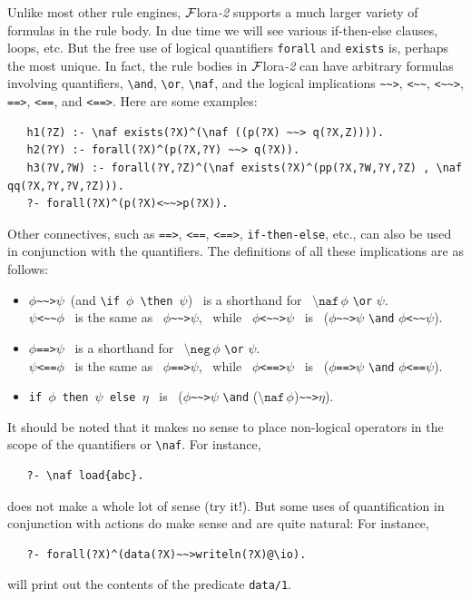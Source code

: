 \documentclass[11pt]{article}
\newcommand{\FLORA}{{\mbox{\sc ${\cal F}${lora}\rm\emph{-2}}}\xspace}
\newcommand{\FLSYSTEM}{\FLORA}
\newcommand{\rnafarr}{\texttt{\textasciitilde\textasciitilde>}}
\newcommand{\lnafarr}{\texttt{<\textasciitilde\textasciitilde}}
\newcommand{\rlnafarr}{\texttt{<\textasciitilde\textasciitilde>}}
\newcommand{\bs}{\textbackslash}
\newcommand{\RULELOGNAF}{{\texttt{{\bs}naf}}\xspace}
\newcommand{\RULELOGNEG}{{\texttt{{\bs}neg}}\xspace}
\begin{document}
\index{\rnafarr}
\index{\lnafarr}
\index{\rlnafarr}
\index{\url{==>}}
\index{\url{<==}}
\index{\url{<==>}}
Unlike most other rule engines, \FLSYSTEM supports a much larger variety of
formulas in the rule body. In due time we will see various if-then-else
clauses, loops, etc. But the free use of logical quantifiers \texttt{forall} and
\texttt{exists} is, perhaps the most unique. In fact, the rule bodies in 
\FLSYSTEM can have
arbitrary formulas involving quantifiers, \texttt{\bs{}and},
\texttt{\bs{}or}, \texttt{\RULELOGNAF}, and the logical implications \rnafarr,
\lnafarr, \rlnafarr, \texttt{==>}, \texttt{<==}, and \texttt{<==>}.
Here are some examples:
\begin{verbatim}
   h1(?Z) :- \naf exists(?X)^(\naf ((p(?X) ~~> q(?X,Z)))).
   h2(?Y) :- forall(?X)^(p(?X,?Y) ~~> q(?X)). 
   h3(?V,?W) :- forall(?Y,?Z)^(\naf exists(?X)^(pp(?X,?W,?Y,?Z) , \naf qq(?X,?Y,?V,?Z))).
   ?- forall(?X)^(p(?X)<~~>p(?X)).
\end{verbatim}
Other connectives, such as \texttt{==>}, \texttt{<==}, \texttt{<==>}, \texttt{if-then-else}, etc., 
can also be used in conjunction with the quantifiers.
The definitions of all these implications are as follows:
\begin{itemize}
\item  $\phi$\rnafarr$\psi$\, (and
  \texttt{\bs{}if\,$\phi$\,\bs{}then\,$\psi$})~
  is a shorthand for~ $\RULELOGNAF\,\phi$
  \texttt{\bs{}or} $\psi$.\\
  $\psi$\lnafarr$\phi$~ is the same as~ $\phi$\rnafarr$\psi$,~ while~
  $\phi$\rlnafarr$\psi$~ is~ ($\phi$\rnafarr$\psi$ \texttt{\bs{}and} 
  $\phi$\lnafarr$\psi$).
\item  $\phi$\texttt{==>}$\psi$~ is a shorthand for~ $\RULELOGNEG\,\phi$
  \texttt{\bs{}or} $\psi$.\\
  $\psi$\texttt{<==}$\phi$~ is the same as~ $\phi$\texttt{==>}$\psi$,~ while~
  $\phi$\texttt{<==>}$\psi$~ is~ ($\phi$\texttt{==>}$\psi$ \texttt{\bs{}and}
  $\phi$\texttt{<==}$\psi$).
\item \texttt{if\,$\phi$\,then\,$\psi$\,else\,$\eta$}~ is~
  ($\phi$\rnafarr$\psi$ \texttt{\bs{}and}
  ($\RULELOGNAF\,\phi$)\rnafarr$\eta$).
\end{itemize}

It should be noted that it makes no
sense to place non-logical operators in the scope of the quantifiers or
\texttt{\RULELOGNAF}. For instance,
\begin{verbatim}
   ?- \naf load{abc}.
\end{verbatim}
does not make a whole lot of sense (try it!). But some uses of
quantification in conjunction with actions do make sense and are quite natural:
For instance,
\begin{verbatim}
   ?- forall(?X)^(data(?X)~~>writeln(?X)@\io).
\end{verbatim}
will print out the contents of the predicate \texttt{data/1}. 
\end{document}
